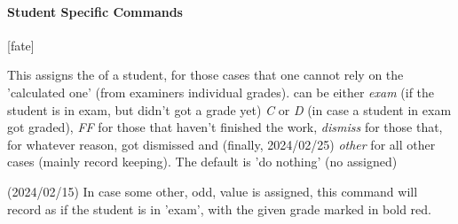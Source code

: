 \documentclass[article,nogeometry,english,tocdepth=3,secdepth=3]{ufrgscca} %
\begin{document}

\paragraph{Student Specific Commands}\label{student-specific-commands}
\begin{codedescribe}[code,update=2023/11/18,update=2024/02/15,update=2024/02/25]{\studentfate}
	\begin{codesyntax}%
		\tsmacro{\studentfate}[fate]{}
	\end{codesyntax}
This assigns the  of a student, for those cases that one cannot rely on the 'calculated one' (from examiners individual grades).  can be either \emph{exam} (if the student is in exam, but didn't got a grade yet) \emph{C} or \emph{D} (in case a student in exam got graded), \emph{FF} for those that haven't finished the work, \emph{dismiss} for those that, for whatever reason, got dismissed and (finally, 2024/02/25) \emph{other} for all other cases (mainly record keeping). The default is 'do nothing' (no  assigned)
\end{codedescribe}
\begin{tsremark}
(2024/02/15) In case some other, odd, value is assigned, this command will record as if the student is in 'exam', with the given grade  marked in bold red.
\end{tsremark}
\end{document}
